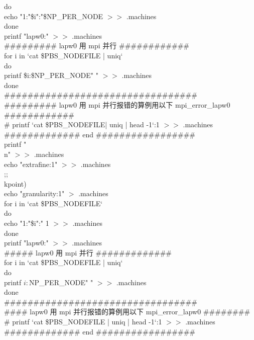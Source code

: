 \documentclass[10pt,a4paper]{article}
\begin{document}
do \\
echo "1:"\$i":"\$NP\_PER\_NODE $>>$ .machines \\
done \\
printf "lapw0:" $>>$ .machines \\
\#\#\#\#\#\#\#\#\# \textrm{lapw0} 用 \textrm{mpi} 并行 \#\#\#\#\#\#\#\#\#\#\#\# \\
for i in `cat \${PBS\_NODEFILE} | uniq` \\
do \\
printf \$i:\$NP\_PER\_NODE" " $>>$ .machines \\
done \\
\#\#\#\#\#\#\#\#\#\#\#\#\#\#\#\#\#\#\#\#\#\#\#\#\#\#\#\#\#\#\#\#\# \\
\#\#\#\#\#\#\#\#\# \textrm{lapw0} 用 \textrm{mpi} 并行报错的算例用以下 mpi\_error\_lapw0 \#\#\#\#\#\#\#\#\#\#\#\# \\
\# printf `cat \${PBS\_NODEFILE}| uniq | head -1`:1 $>>$ .machines \\
\#\#\#\#\#\#\#\#\#\#\#\#\# end \#\#\#\#\#\#\#\#\#\#\#\#\#\#\#\#\# \\
printf "\\n" $>>$ .machines \\ 
echo "extrafine:1" $>>$ .machines \\
;; \\
kpoint) \\
echo "granularity:1" $>$ .machines \\
for i in `cat \$PBS\_NODEFILE` \\
do \\
echo "1:"\$i":" 1 $>>$ .machines \\
done \\
printf "lapw0:" $>>$ .machines \\
\#\#\#\#\# \textrm{lapw0} 用 \textrm{mpi} 并行 \#\#\#\#\#\#\#\#\#\#\#\#\# \\
for i in `cat \${PBS\_NODEFILE} | uniq` \\
do \\
printf $i:$NP\_PER\_NODE" " $>>$ .machines \\
done \\
\#\#\#\#\#\#\#\#\#\#\#\#\#\#\#\#\#\#\#\#\#\#\#\#\#\#\#\#\#\#\#\#\# \\
\#\#\#\# \textrm{lapw0} 用 \textrm{mpi} 并行报错的算例用以下 \textrm{mpi\_error\_lapw0} \#\#\#\#\#\#\#\# \\
\# printf `cat \${PBS\_NODEFILE} | uniq | head -1`:1 $>>$ .machines \\
\#\#\#\#\#\#\#\#\#\#\#\#\# end \#\#\#\#\#\#\#\#\#\#\#\#\#\#\#\#\# \\
\end{document}
